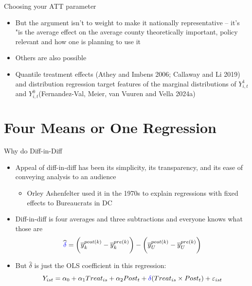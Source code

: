 \documentclass{beamer}
\begin{document}
\begin{frame}{Choosing your ATT parameter}

\begin{itemize}
\item But the argument isn't to weight to make it nationally representative -- it's "is the average effect on the average county theoretically important, policy relevant and how one is planning to use it
\item Others are also possible
\item Quantile treatment effects (Athey and Imbens 2006; Callaway and Li 2019) and distribution regression target features of the marginal distributions of $Y^1_{i,t}$ and $Y^0_{i,t}$(Fernandez-Val, Meier, van Vuuren and Vella 2024a)
\end{itemize}

\end{frame}

\section{Four Means or One Regression}




\begin{frame}{Why do Diff-in-Diff}

\begin{itemize}
\item Appeal of diff-in-diff has been its simplicity, its transparency, and its ease of conveying analysis to an audience
	\begin{itemize}
	\item Orley Ashenfelter used it in the 1970s to explain regressions with fixed effects to Bureaucrats in DC
	\end{itemize}
\item Diff-in-diff is four averages and three subtractions and everyone knows what those are
$$\widehat{\textcolor{blue}{\delta}} = \bigg ( \overline{y}_k^{post(k)} - \overline{y}_k^{pre(k)} \bigg ) - \bigg ( \overline{y}_U^{post(k)} - \overline{y}_U^{pre(k)} \bigg ) $$
\item But $\widehat{\delta}$ is just the OLS coefficient in this regression:
$$Y_{ist} = \alpha_0 + \alpha_1 Treat_{is} + \alpha_2 Post_{t} + \textcolor{blue}{\delta} (Treat_{is} \times Post_t) + \varepsilon_{ist} $$
\end{itemize}

\end{frame}
\end{document}

